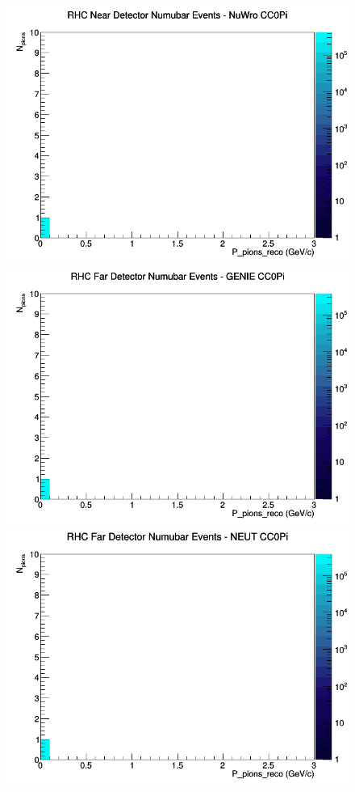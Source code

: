 \documentclass[12pt]{article}
\begin{document}
\begin{figure}[h]
\includegraphics[width=\linewidth]{eff_N_P/LAr/pions/CC0Pi_RHC_ND_numubar_N_P_NuWro.png}
\endminipage
\newline
{}
\includegraphics[width=\linewidth]{eff_N_P/LAr/pions/CC0Pi_RHC_FD_numubar_N_P_GENIE.png}
\endminipage
{}
\includegraphics[width=\linewidth]{eff_N_P/LAr/pions/CC0Pi_RHC_FD_numubar_N_P_NEUT.png}

\end{figure}
\end{document}
